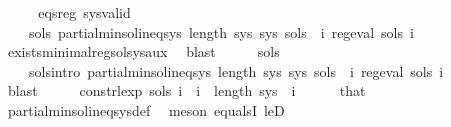 \begin{isabellebody}
\ {\isacharminus}{\kern0pt}\isanewline
\ \ \isamarkupfalse%
\ eqs{\isacharunderscore}{\kern0pt}reg\ sys{\isacharunderscore}{\kern0pt}valid\ \isamarkupfalse%
\isanewline
\ \ \ \ {\isachardoublequoteopen}{\isasymexists}sols{\isachardot}{\kern0pt}\ partial{\isacharunderscore}{\kern0pt}min{\isacharunderscore}{\kern0pt}sol{\isacharunderscore}{\kern0pt}ineq{\isacharunderscore}{\kern0pt}sys\ {\isacharparenleft}{\kern0pt}length\ sys{\isacharparenright}{\kern0pt}\ sys\ sols\ {\isasymand}\ {\isacharparenleft}{\kern0pt}{\isasymforall}i{\isachardot}{\kern0pt}\ reg{\isacharunderscore}{\kern0pt}eval\ {\isacharparenleft}{\kern0pt}sols\ i{\isacharparenright}{\kern0pt}{\isacharparenright}{\kern0pt}{\isachardoublequoteclose}\isanewline
\ \ \ \ \isamarkupfalse%
\ exists{\isacharunderscore}{\kern0pt}minimal{\isacharunderscore}{\kern0pt}reg{\isacharunderscore}{\kern0pt}sol{\isacharunderscore}{\kern0pt}sys{\isacharunderscore}{\kern0pt}aux\ \isamarkupfalse%
\ blast\isanewline
\ \ \isamarkupfalse%
\ \isamarkupfalse%
\ sols\ \isanewline
\ \ \ \ sols{\isacharunderscore}{\kern0pt}intro{\isacharcolon}{\kern0pt}\ {\isachardoublequoteopen}partial{\isacharunderscore}{\kern0pt}min{\isacharunderscore}{\kern0pt}sol{\isacharunderscore}{\kern0pt}ineq{\isacharunderscore}{\kern0pt}sys\ {\isacharparenleft}{\kern0pt}length\ sys{\isacharparenright}{\kern0pt}\ sys\ sols\ {\isasymand}\ {\isacharparenleft}{\kern0pt}{\isasymforall}i{\isachardot}{\kern0pt}\ reg{\isacharunderscore}{\kern0pt}eval\ {\isacharparenleft}{\kern0pt}sols\ i{\isacharparenright}{\kern0pt}{\isacharparenright}{\kern0pt}{\isachardoublequoteclose}\isanewline
\ \ \ \ \isamarkupfalse%
\ blast\isanewline
\ \ \isamarkupfalse%
\ \isamarkupfalse%
\ {\isachardoublequoteopen}const{\isacharunderscore}{\kern0pt}rlexp\ {\isacharparenleft}{\kern0pt}sols\ i{\isacharparenright}{\kern0pt}{\isachardoublequoteclose}\ \ {\isachardoublequoteopen}i\ {\isacharless}{\kern0pt}\ length\ sys{\isachardoublequoteclose}\ \ i\isanewline
\ \ \ \ \isamarkupfalse%
\ that\ \isamarkupfalse%
\ partial{\isacharunderscore}{\kern0pt}min{\isacharunderscore}{\kern0pt}sol{\isacharunderscore}{\kern0pt}ineq{\isacharunderscore}{\kern0pt}sys{\isacharunderscore}{\kern0pt}def\ \isamarkupfalse%
\ {\isacharparenleft}{\kern0pt}meson\ equals{}I\ leD{\isacharparenright}{\kern0pt}\isanewline

\end{isabellebody}
